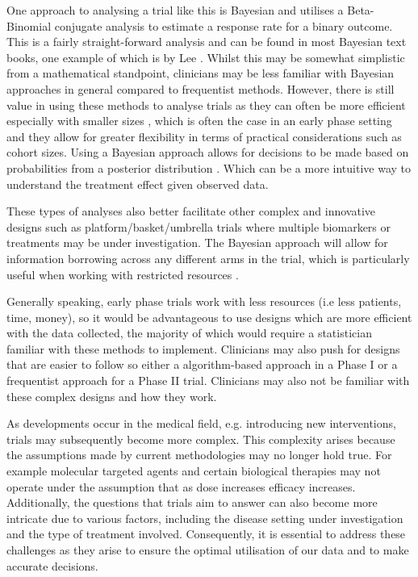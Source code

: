 One approach to analysing a trial like this is Bayesian and utilises a Beta-Binomial conjugate analysis to estimate a response rate for a binary outcome. This is a fairly straight-forward analysis and can be found in most Bayesian text books, one example of which is by Lee \cite{leeBayesianStatisticsIntroduction2012}. Whilst this may be somewhat simplistic from a mathematical standpoint, clinicians may be less familiar with Bayesian approaches in general compared to frequentist methods. However, there is still value in using these methods to analyse trials as they can often be more efficient especially with smaller sizes \cite{inoueRelationshipBayesianFrequentist2005}, which is often the case in an early phase setting and they allow for greater flexibility in terms of practical considerations such as cohort sizes. Using a Bayesian approach allows for decisions to be made based on probabilities from a posterior distribution \cite{savilleUtilityBayesianPredictive2014}. Which can be a more intuitive way to understand the treatment effect given observed data.    

These types of analyses also better facilitate other complex and innovative designs such as platform/basket/umbrella trials where multiple biomarkers or treatments may be under investigation. The Bayesian approach will allow for information borrowing across any different arms in the trial, which is particularly useful when working with restricted resources \cite{carlinBayesianComplexInnovative2022}. 

Generally speaking, early phase trials work with less resources (i.e less patients, time, money), so it would be advantageous to use designs which are more efficient with the data collected, the majority of which would require a statistician familiar with these methods to implement. Clinicians may also push for designs that are easier to follow so either a algorithm-based approach in a Phase \RN{1} or a frequentist approach for a Phase \RN{2} trial. Clinicians may also not be familiar with these complex designs and how they work. 

As developments occur in the medical field, e.g. introducing new interventions, trials may subsequently become more complex.  This complexity arises because the assumptions made by current methodologies may no longer hold true. For example molecular targeted agents and certain biological therapies may not operate under the assumption that as dose increases efficacy increases. Additionally, the questions that trials aim to answer can also become more intricate due to various factors, including the disease setting under investigation and the type of treatment involved. Consequently, it is essential to address these challenges as they arise to ensure the optimal utilisation of our data and to make accurate decisions. 

